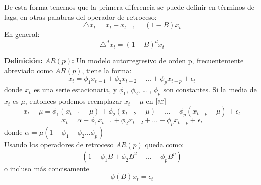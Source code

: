 De esta forma tenemos que la primera diferencia se puede definir en t\'erminos de lags, en otras palabras del operador de retroceso:
\begin{equation}
\triangle x_t = x_t - x_{t-1}= (1 - B) x_t 
\end{equation}
En general:
\begin{equation}
\triangle^d x_t = (1 - B)^d x_t 
\end{equation}

\begin{mdframed}[style=MyFrame]
\begin{definition}\label{def2}
	\textbf{Definici\'on:  $AR (p)$:}
	Un modelo autorregresivo de orden p, frecuentemente abreviado como $AR(p)$, tiene la forma:
	\begin{equation}
	x_t = \phi_1 x_{t-1} +  \phi_2 x_{t-2} + \dots{} +  \phi_p x_{t-p} + \epsilon_t
	\label{ar}
	\end{equation}
	donde $x_t$ es una serie estacionaria, y  $\phi_1$,  $\phi_2$,  \dots{} , $\phi_p$ son constantes. 
	Si la media de $x_t$ es $\mu$, entonces podemos reemplazar $x_t-\mu$ en $\eqref{ar}$
	\begin{equation}
	x_t-\mu = \phi_1 (x_{t-1}-\mu) +  \phi_2 (x_{t-2}-\mu) + \dots{} +  \phi_p (x_{t-p}-\mu) + \epsilon_t
	\end{equation}
	\begin{equation}
	x_t = \alpha + \phi_1 x_{t-1} +  \phi_2 x_{t-2} + \dots{} +  \phi_p x_{t-p} + \epsilon_t
	\end{equation}
	donde $\alpha = \mu(1-\phi_1-\phi_2\dots{}\phi_p)$\\
	Usando los operadores de retroceso $AR(p)$ queda como:
	\begin{equation}
	(1- \phi_1 B + \phi_2 B^2 - \dots{}  - \phi_p B^p )
	\end{equation}
	o incluso m\'as concisamente
	\begin{equation}
	\phi (B) x_t = \epsilon_t
	\end{equation}	
\end{definition}
\end{mdframed}


